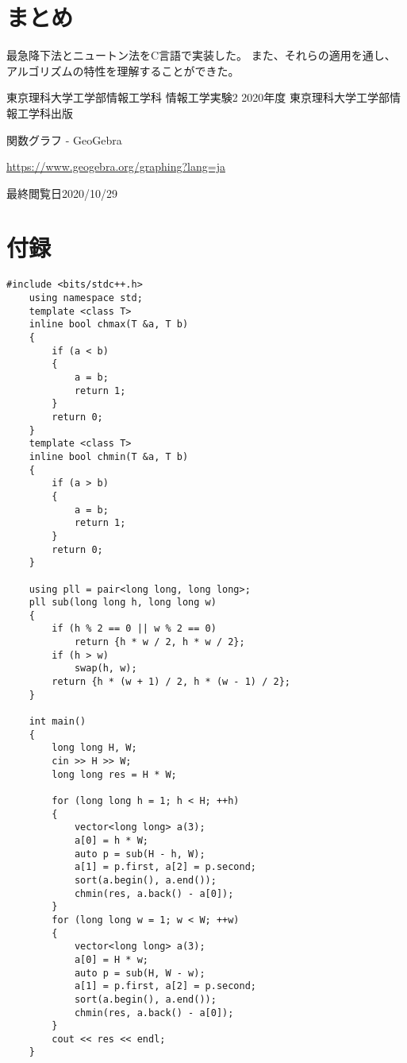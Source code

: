 \documentclass[12pt]{jarticle}
\begin{document}
\section{まとめ}
最急降下法とニュートン法をC言語で実装した。
また、それらの適用を通し、
アルゴリズムの特性を理解することができた。

\clearpage

\begin{thebibliography}{99}
    \label{sannkoubunnkenn_chapter}
    東京理科大学工学部情報工学科 情報工学実験2 2020年度
    東京理科大学工学部情報工学科出版

    関数グラフ - GeoGebra

    \url{https://www.geogebra.org/graphing?lang=ja}

    最終閲覧日2020/10/29

\end{thebibliography}


\clearpage

\appendix
\section{付録}
\begin{lstlisting}[style = lstcpp,caption=saiteki.cpp]
    #include <bits/stdc++.h>
    using namespace std;
    template <class T>
    inline bool chmax(T &a, T b)
    {
        if (a < b)
        {
            a = b;
            return 1;
        }
        return 0;
    }
    template <class T>
    inline bool chmin(T &a, T b)
    {
        if (a > b)
        {
            a = b;
            return 1;
        }
        return 0;
    }
    
    using pll = pair<long long, long long>;
    pll sub(long long h, long long w)
    {
        if (h % 2 == 0 || w % 2 == 0)
            return {h * w / 2, h * w / 2};
        if (h > w)
            swap(h, w);
        return {h * (w + 1) / 2, h * (w - 1) / 2};
    }
    
    int main()
    {
        long long H, W;
        cin >> H >> W;
        long long res = H * W;
    
        for (long long h = 1; h < H; ++h)
        {
            vector<long long> a(3);
            a[0] = h * W;
            auto p = sub(H - h, W);
            a[1] = p.first, a[2] = p.second;
            sort(a.begin(), a.end());
            chmin(res, a.back() - a[0]);
        }
        for (long long w = 1; w < W; ++w)
        {
            vector<long long> a(3);
            a[0] = H * w;
            auto p = sub(H, W - w);
            a[1] = p.first, a[2] = p.second;
            sort(a.begin(), a.end());
            chmin(res, a.back() - a[0]);
        }
        cout << res << endl;
    }
\end{lstlisting}


\end{document}
